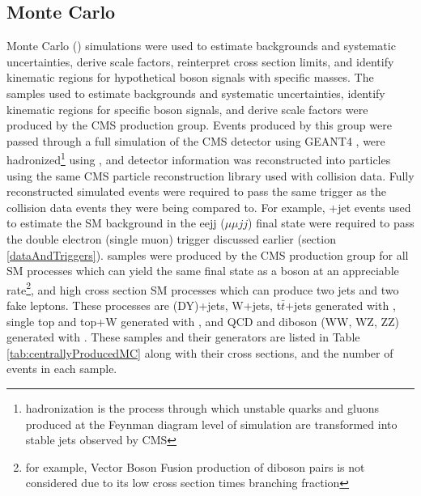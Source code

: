 \subsection{Monte Carlo}
\label{MC}
Monte Carlo (\MC) simulations were used to estimate backgrounds and systematic uncertainties, derive
scale factors, reinterpret \WR cross section limits, and identify kinematic regions for
hypothetical \WR boson signals with specific \WR masses.  The \MC samples used to estimate backgrounds
and systematic uncertainties, identify kinematic regions for specific \WR boson signals, and derive
scale factors were produced by the CMS \MC production group.  Events produced by this group were
passed through a full simulation of the CMS detector using GEANT4 \cite{geant4}, were hadronized\footnote{hadronization
is the process through which unstable quarks and gluons produced at the Feynman diagram level of simulation
are transformed into stable jets observed by CMS} using \PYTHIA, and detector information was reconstructed
into particles using the same CMS particle reconstruction library used with collision data.
Fully reconstructed simulated events were required to pass the same trigger as the collision
data events they were being compared to.  For example, \DY +jet events used to estimate the SM
background in the eejj ($\mu\mu jj$) final state were required to pass the double electron
(single muon) trigger discussed earlier (section \ref{dataAndTriggers}).
\MC samples were produced by the CMS \MC production group for all SM processes which can yield
the same final state as a \WR boson at an appreciable rate\footnote{for example, Vector Boson Fusion production
of diboson pairs is not considered due to its low cross section times branching
fraction}, and high cross section SM processes which can produce two jets
and two fake leptons.  These processes are \DY (DY)+jets, W+jets, t$\bar{t}$+jets generated
with \MADGRAPH \cite{madgraph}, single top and top+W generated with \POWHEG \cite{powheg}, and
QCD and diboson (WW, WZ, ZZ) generated with \PYTHIA \cite{pythia8}\cite{Sjostrand:2006za}.
These samples and their generators are listed in Table \ref{tab:centrallyProducedMC} along
with their cross sections, and the number of events in each sample.

